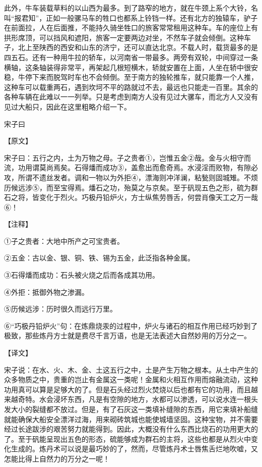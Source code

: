 \documentclass[12pt,UTF8]{ctexbook}
\begin{document}
此外，牛车装载草料的以山西为最多。到了路窄的地方，就在牛颈上系个大铃，名叫“报君知”，正如一般骡马车的牲口也都系上铃铛一样。还有北方的独辕车，驴子在前面拉，人在后面推，不能持久骑坐牲口的旅客常常租用这种车。车的座位上有拱形席顶，可以挡风和遮阳，旅客一定要两边对坐，不然车子就会倾倒。这种车子，北上至陕西的西安和山东的济宁，还可以直达北京。不载人时，载货最多的是四五石。还有一种用牛拉的轿车，以河南省一带最多。两旁有双轮，中间穿过一条横轴，这条轴装得非常平，再架起几根短横木，轿就安置在上面，人坐在轿中很安稳，牛停下来而脱驾时车也不会倾倒。至于南方的独轮推车，就只能靠一个人推，这种车可以载重两石，遇到坎坷不平的路就过不去，最远也只能走一百里。其余的各种车辆在此难以一一列举。只是考虑到南方人没有见过大骡车，而北方人又没有见过大船只，因此在这里粗略介绍一下。

宋子曰

【原文】

宋子曰：五行之内，土为万物之母。子之贵者①，岂惟五金②哉。金与火相守而流，功用谓莫尚焉矣。石得燔而成功③，盖愈出而愈奇焉。水浸淫而败物，有隙必攻，所谓不遗丝发者。调和一物以为外拒④，漂海则冲洋澜，粘甃则固城雉。不烦历候远涉⑤，而至宝得焉。燔石之功，殆莫之与京矣。至于矾现五色之形，硫为群石之将，皆变化于烈火。巧极丹铅炉火，方士纵焦劳唇舌，何尝肖像天工之万一哉⑥！

【注释】

①子之贵者：大地中所产之可宝贵者。

②五金：古以金、银、铜、铁、锡为五金，此泛指各种金属。

③石得燔而成功：石头被火烧之后而各成其功用。

④外拒：抵御外物之渗漏。

⑤历候远涉：历时很久而远行万里。

⑥“巧极丹铅炉火”句：在炼鼎烧汞的过程中，炉火与诸石的相互作用已经巧妙到了极致，那些炼丹方士就是费尽千言万语，也是无法表述大自然妙用的万分之一。

【译文】

宋子说：在水、火、木、金、土这五行之中，土是产生万物之根本。从土中产生的众多物质之中，贵重的岂止有金属这一类呢！金属和火相互作用而熔融流动，这种功用真可以算是足够大的了。但是石头经过烈火焚烧以后也都有它的功用，而且越来越奇特。水会浸坏东西，凡是有空隙的地方，水都可以渗透，可以说水连一根头发大小的裂缝都不放过。但是，有了石灰这一类填补缝隙的东西，用它来填补船缝就能确保大船安全漂洋过海，用来砌砖筑城也能使城墙坚固。这种宝物，并不需要经过长途跋涉的艰苦努力就能得到。因此，大概没有什么东西比烧石的功用更大的了。至于矾能呈现出五色的形态，硫能够成为群石的主将，这些也都是从烈火中变化生成的。炼丹术可以说是最巧妙的了，然而，尽管炼丹术士唇焦舌烂地吹嘘，又怎能比得上自然力的万分之一呢！
\end{document}
